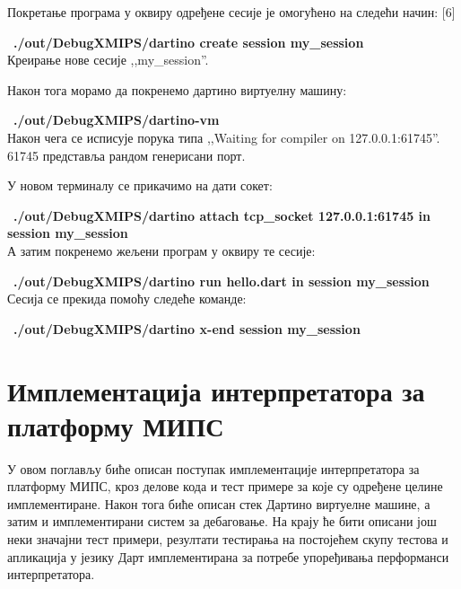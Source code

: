 \documentclass[12pt,oneside]{memoir}
\begin{document}
Покретање програма у оквиру одређене сесије је омогућено на следећи начин: [6]%

~\textbf{./out/DebugXMIPS/dartino create session my\_session}\\
Креирање нове сесије ,,my\_session''.

Након тога морамо да покренемо дартино виртуелну машину:

~\textbf{./out/DebugXMIPS/dartino-vm}\\
Након чега се исписује порука типа ,,Waiting for compiler on 127.0.0.1:61745''. 61745 представља рандом генерисани порт.

У новом терминалу се прикачимо на дати сокет:

~\textbf{./out/DebugXMIPS/dartino attach tcp\_socket 127.0.0.1:61745 in session my\_session}\\

А затим покренемо жељени програм у оквиру те сесије:

~\textbf{./out/DebugXMIPS/dartino run hello.dart in session my\_session}\\

Сесија се прекида помоћу следеће команде:

~\textbf{./out/DebugXMIPS/dartino x-end session my\_session}\\


\chapter{Имплементација интерпретатора за платформу МИПС}
\label{chp:implementacija}
У овом поглављу биће описан поступак имплементације интерпретатора за платформу МИПС, кроз делове кода и тест примере за које су одређене целине имплементиране. Након тога биће описан стек Дартино виртуелне машине, а затим и имплементирани систем за дебаговање. На крају ће бити описани још неки значајни тест примери, резултати тестирања на постојећем скупу тестова и апликација у језику Дарт имплементирана за потребе упоређивања перформанси интерпретатора.
\end{document}
